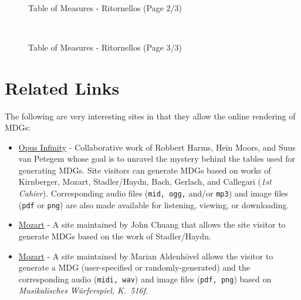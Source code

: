 \documentclass[a4paper,x11names,svgnames,10pt]{article}
\begin{document}
{\newpage
${}_{}$\\
\vspace{0.10in}
\begin{figure}[H]
	\centering
	\def\svgwidth{0.975\columnwidth}
	
	\caption{Table of Measures - Ritornellos (Page 2/3)}
	\label{fig:meas11}
\end{figure}

\newpage
${}_{}$\\
\vspace{0.10in}
\begin{figure}[H]
	\centering
	\def\svgwidth{0.975\columnwidth}
	
	\caption{Table of Measures - Ritornellos (Page 3/3)}
	\label{fig:meas12}
\end{figure}


\section{Related Links}
The following are very interesting sites in that they allow the online rendering of MDGs:
\begin{itemize}
	\item \href{https://opus-infinity.org}{Opus Infinity} - Collaborative work of Robbert Harms, Hein Moors, and Suus van Petegem whose goal is to unravel the mystery behind the tables used for generating MDGs.  Site visitors can generate MDGs based on works of Kirnberger, Mozart, Stadler/Haydn, Bach, Gerlach, and Callegari ({\it 1st Cahier}).  Corresponding audio files ({\tt mid, ogg,} and/or {\tt mp3}) and image files ({\tt pdf} or {\tt png}) are also made available for listening, viewing, or downloading.
	
	\item  \href{http://sunsite.univie.ac.at/Mozart/dice/}{Mozart} - A site maintained by John Chuang that allows the site visitor to generate MDGs based on the work of Stadler/Haydn.
	
	\item  \href{https://marian-aldenhoevel.de/mozart/}{Mozart} - A site maintained by Marian Aldenh\"{o}vel allows the visitor to generate a MDG (user-specified or randomly-generated) and the corresponding audio ({\tt midi, wav}) and image files ({\tt pdf, png}) based on {\em Musikalisches W\"{u}rferspiel, K.\ 516f}.
	

\end{itemize}}
\end{document}
